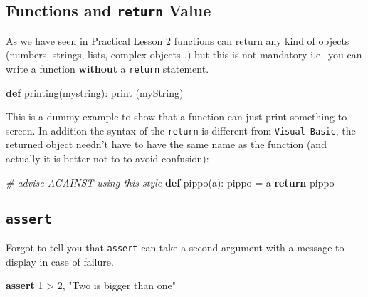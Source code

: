 \documentclass[11pt]{article}
\newenvironment{Shaded}{}{}
\newcommand{\KeywordTok}[1]{\textcolor[rgb]{0.00,0.44,0.13}{\textbf{{#1}}}}
\newcommand{\DecValTok}[1]{\textcolor[rgb]{0.25,0.63,0.44}{{#1}}}
\newcommand{\StringTok}[1]{\textcolor[rgb]{0.25,0.44,0.63}{{#1}}}
\newcommand{\CommentTok}[1]{\textcolor[rgb]{0.38,0.63,0.69}{\textit{{#1}}}}
\newcommand{\NormalTok}[1]{{#1}}
\newcommand{\ControlFlowTok}[1]{\textcolor[rgb]{0.00,0.44,0.13}{\textbf{{#1}}}}
\newcommand{\OperatorTok}[1]{\textcolor[rgb]{0.40,0.40,0.40}{{#1}}}
\newcommand{\BuiltInTok}[1]{{#1}}
\begin{document}
\hypertarget{functions-and-return-value}{%
\subsection{\texorpdfstring{Functions and \texttt{return}
Value}{Functions and return Value}}\label{functions-and-return-value}}

As we have seen in Practical Lesson 2 functions can return any kind of
objects (numbers, strings, lists, complex objects\ldots{}) but this is
not mandatory i.e.~you can write a function \textbf{without} a
\texttt{return} statement.

\begin{Shaded}
\begin{Highlighting}[]
\KeywordTok{def}\NormalTok{ printing(mystring):}
    \BuiltInTok{print}\NormalTok{ (myString)}
\end{Highlighting}
\end{Shaded}

This is a dummy example to show that a function can just print something
to screen. In addition the syntax of the \texttt{return} is different
from \texttt{Visual\ Basic}, the returned object needn't have to have
the same name as the function (and actually it is better not to to avoid
confusion):

\begin{Shaded}
\begin{Highlighting}[]
\CommentTok{# advise AGAINST using this style}
\KeywordTok{def}\NormalTok{ pippo(a):}
\NormalTok{    pippo }\OperatorTok{=}\NormalTok{ a}
    \ControlFlowTok{return}\NormalTok{ pippo}
\end{Highlighting}
\end{Shaded}

\hypertarget{assert}{%
\subsection{\texorpdfstring{\texttt{assert}}{assert}}\label{assert}}

Forgot to tell you that \texttt{assert} can take a second argument with
a message to display in case of failure.

\begin{Shaded}
\begin{Highlighting}[]
\ControlFlowTok{assert} \DecValTok{1} \OperatorTok{>} \DecValTok{2}\NormalTok{, }\StringTok{"Two is bigger than one"}
\end{Highlighting}
\end{Shaded}
\end{document}
